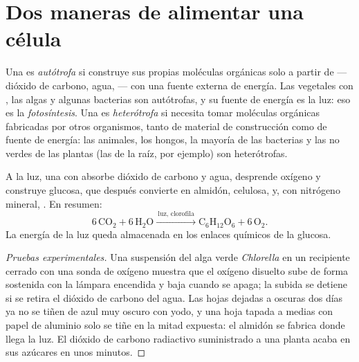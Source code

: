 \section{Dos maneras de alimentar una célula}

\begin{definition}\label{def:g10:cell-metabolism:autotrophy}
Una  es \emph{autótrofa} si construye sus
propias moléculas orgánicas solo a partir de  ---
dióxido de carbono, agua,  --- con una fuente externa de
energía. Las  vegetales con , las algas y algunas
bacterias son autótrofas, y su fuente de energía es la luz: eso es la
\emph{fotosíntesis}. Una  es
\emph{heterótrofa} si necesita tomar moléculas
orgánicas fabricadas por otros organismos, tanto de material de
construcción como de fuente de energía: las  animales, los
hongos, la mayoría de las bacterias y las  no verdes de las
plantas (las de la raíz, por ejemplo) son heterótrofas.
\end{definition}

\begin{proposition}[La fotosíntesis]\label{prop:g10:cell-metabolism:photosynthesis}
A la luz, una  con  absorbe dióxido de carbono y
agua, desprende oxígeno y construye glucosa, que después convierte en
almidón, celulosa,  y, con nitrógeno mineral, . En
resumen:
\[
6\,\mathrm{CO_2} + 6\,\mathrm{H_2O} \xrightarrow{\ \text{luz, clorofila}\ }
\mathrm{C_6H_{12}O_6} + 6\,\mathrm{O_2}.
\]
La energía de la luz queda almacenada en los enlaces químicos de la
glucosa.
\end{proposition}
\begin{proof}[Pruebas experimentales]
Una suspensión del alga verde \emph{Chlorella} en un recipiente cerrado
con una sonda de oxígeno muestra que el oxígeno disuelto sube de forma
sostenida con la lámpara encendida y baja cuando se apaga; la subida se
detiene si se retira el dióxido de carbono del agua. Las hojas dejadas
a oscuras dos días ya no se tiñen de azul muy oscuro con yodo, y una
hoja tapada a medias con papel de aluminio solo se tiñe en la mitad
expuesta: el almidón se fabrica donde llega la luz. El dióxido de
carbono radiactivo suministrado a una planta acaba en sus azúcares en
unos minutos.
\end{proof}

